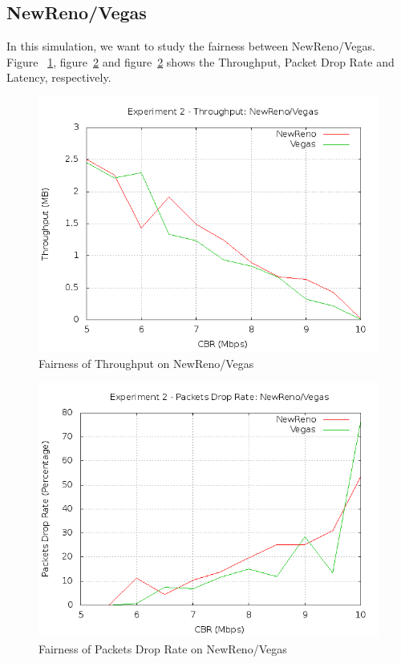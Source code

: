 \documentclass[10pt, conference]{lib/IEEEtran}
\begin{document}
\subsection{NewReno/Vegas}
In this simulation, we want to study the fairness between NewReno/Vegas.
Figure ~\ref{fig:exp2_thp_nv}, figure~\ref{fig:exp2_dr_nv} and 
figure~\ref{fig:exp2_dr_nv} shows the Throughput, Packet Drop Rate and 
Latency, respectively.
\begin{figure}[H]
    \centering
    \includegraphics[width=0.9\linewidth]{plot/exp2-thp-NewReno-Vegas.png}
    \caption{Fairness of Throughput on NewReno/Vegas}
    \label{fig:exp2_thp_nv}
\end{figure}
\begin{figure}[H]
    \centering
    \includegraphics[width=0.9\linewidth]{plot/exp2-dr-NewReno-Vegas.png}
    \caption{Fairness of Packets Drop Rate on NewReno/Vegas}
    \label{fig:exp2_dr_nv}
\end{figure}
\end{document}
